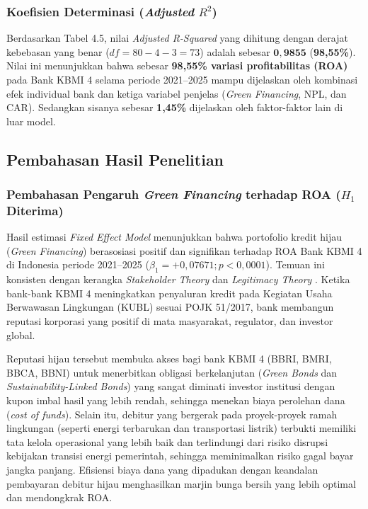 \documentclass[12pt,a4paper]{article}
\numberwithin{equation}{section}
\begin{document}
\subsubsection{Koefisien Determinasi (\texorpdfstring{\emph{Adjusted} $R^2$}{Adjusted R-Squared})}
\noindent
Berdasarkan Tabel 4.5, nilai \emph{Adjusted R-Squared} yang dihitung dengan derajat kebebasan yang benar ($df = 80 - 4 - 3 = 73$) adalah sebesar $\mathbf{0{,}9855}$ (\textbf{98,55\%}). Nilai ini menunjukkan bahwa sebesar \textbf{98,55\% variasi profitabilitas (ROA)} pada Bank KBMI 4 selama periode 2021--2025 mampu dijelaskan oleh kombinasi efek individual bank dan ketiga variabel penjelas (\emph{Green Financing}, NPL, dan CAR). Sedangkan sisanya sebesar \textbf{1,45\%} dijelaskan oleh faktor-faktor lain di luar model.

\subsection{Pembahasan Hasil Penelitian}

\subsubsection{Pembahasan Pengaruh \texorpdfstring{\emph{Green Financing} terhadap ROA ($H_1$ Diterima)}{Green Financing terhadap ROA (H1 Diterima)}}
\noindent
Hasil estimasi \emph{Fixed Effect Model} menunjukkan bahwa portofolio kredit hijau (\emph{Green Financing}) berasosiasi positif dan signifikan terhadap ROA Bank KBMI 4 di Indonesia periode 2021--2025 ($\beta_1 = +0{,}07671; p < 0{,}0001$). Temuan ini konsisten dengan kerangka \emph{Stakeholder Theory} \citep{Freeman2010} dan \emph{Legitimacy Theory} \citep{Suchman1995}. Ketika bank-bank KBMI 4 meningkatkan penyaluran kredit pada Kegiatan Usaha Berwawasan Lingkungan (KUBL) sesuai POJK 51/2017, bank membangun reputasi korporasi yang positif di mata masyarakat, regulator, dan investor global.

\noindent
Reputasi hijau tersebut membuka akses bagi bank KBMI 4 (BBRI, BMRI, BBCA, BBNI) untuk menerbitkan obligasi berkelanjutan (\emph{Green Bonds} dan \emph{Sustainability-Linked Bonds}) yang sangat diminati investor institusi dengan kupon imbal hasil yang lebih rendah, sehingga menekan biaya perolehan dana (\emph{cost of funds}). Selain itu, debitur yang bergerak pada proyek-proyek ramah lingkungan (seperti energi terbarukan dan transportasi listrik) terbukti memiliki tata kelola operasional yang lebih baik dan terlindungi dari risiko disrupsi kebijakan transisi energi pemerintah, sehingga meminimalkan risiko gagal bayar jangka panjang. Efisiensi biaya dana yang dipadukan dengan keandalan pembayaran debitur hijau menghasilkan marjin bunga bersih yang lebih optimal dan mendongkrak ROA.
\end{document}
